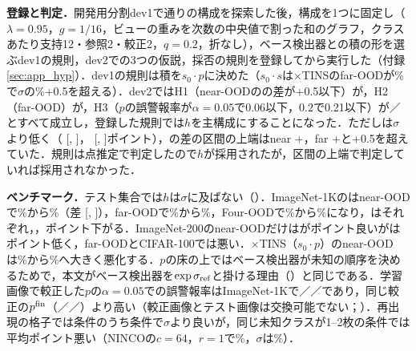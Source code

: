 \textbf{登録と判定．}開発用分割dev1で\NHsExplNCfg{}通りの構成を探索した後，構成を1つに固定し（$\lambda{=}0.95$，$g{=}1/16$，ビューの重みを次数の中央値で割った和のグラフ，クラスあたり支持12・参照2・較正2，$q{=}0.2$，折なし），ベース検出器との積の形を選ぶdev1の規則，dev2での3つの仮説，採否の規則を登録してから実行した（付録\ref{sec:app_hyp}）．dev1の規則は積を$s_0\cdot p$に決めた（$s_0\cdot s$は$\times$TINSのfar-OODが\NHsDevOneTinsFarS\%で$\sigma$の\NHsDevOneTinsSigFar\%+0.5を超える）．dev2ではH1（near-OODの\FPR{}の差が+0.5以下）が\NHsDevTwoNearD{}，H2（far-OOD）が\NHsDevTwoFarD{}，H3（$p$の誤警報率が$\alpha{=}0.05$で0.06以下，$0.2$で0.21以下）が\NHsDevTwoFprFive{}／\NHsDevTwoFprTwenty{}とすべて成立し，登録した規則では$h$を主構成にすることになった．ただし\AUC{}は$\sigma$より低く（\NHsDevTwoNearDAuc{} [\NHsDevTwoNearDAucLo, \NHsDevTwoNearDAucHi]，\NHsDevTwoFarDAuc{} [\NHsDevTwoFarDAucLo, \NHsDevTwoFarDAucHi]ポイント），\FPR{}の差の区間の上端はnear +\NRHsUpperNear{}，far +\NRHsUpperFar{}と+0.5を超えていた．規則は点推定で判定したので$h$が採用されたが，区間の上端で判定していれば採用されなかった．

\begin{table}[htbp]
\centering
\caption{一つの量$h$（登録した構成）と交差適合した$\sigma$（単体，ベンチマークは6通りの抽出の平均，dev2は5通り；差は$h-\sigma$，抽出を単位とする対応のある95\% $t$区間）．$\times$TINSの$h$はdev1の規則で選んだ$s_0\cdot p$．}
\label{tab:h16}
\vspace{1.5mm}

\end{table}

\textbf{ベンチマーク．}テスト集合では$h$は$\sigma$に及ばない（）．ImageNet-1Kの\FPR{}はnear-OODで\NHsTestNearSigFpr\%から\NHsTestNearFpr\%（差\NHsTestNearD{} [\NHsTestNearLo, \NHsTestNearHi]），far-OODで\NHsTestFarSigFpr\%から\NHsTestFarFpr\%，Four-OODで\NHsTestFourSigFpr\%から\NHsTestFourFpr\%になり，\AUC{}はそれぞれ\NRAbsHsTestNearDAucVal{}，\NRAbsHsTestFarDAucVal{}，\NRAbsHsTestFourDAucVal{}ポイント下がる．ImageNet-200のnear-OODだけは\FPR{}が\NRAbsHsInTwoHundredNearDVal{}ポイント良いが\AUC{}は\NRAbsHsInTwoHundredNearDAucVal{}ポイント低く，far-OODとCIFAR-100では悪い．$\times$TINS（$s_0\cdot p$）のnear-OODは\NHsTestNearTinsSigFpr\%から\NHsTestNearTinsFpr\%へ大きく悪化する．$p$の床の上ではベース検出器が未知の順序を決めるためで，本文がベース検出器を$\exp\sigma_{\mathrm{ref}}$と掛ける理由（）と同じである．学習画像で較正した$p$の$\alpha{=}0.05$での誤警報率はImageNet-1Kで\NHsTestNearValFive{}／\NHsTestFarValFive{}／\NHsTestFourValFive{}であり，同じ較正の$p^{\mathrm{fin}}$（\NHsTestNearSigValFive{}／\NHsTestFarSigValFive{}／\NHsTestFourSigValFive）より高い（較正画像とテスト画像は交換可能でない；）．再出現の格子では\NHsRecNCells{}条件のうち\NHsRecNBetter{}条件で$\sigma$より良いが，同じ未知クラスが1--2枚の\NHsRecNSingleton{}条件では平均\NHsRecSingletonMeanD{}ポイント悪い（NINCOの$c{=}64$，$r{=}1$で\NHsRecNincoCSixtyFourROne\%，$\sigma$は\NHsRecNincoCSixtyFourROneSig\%）．

